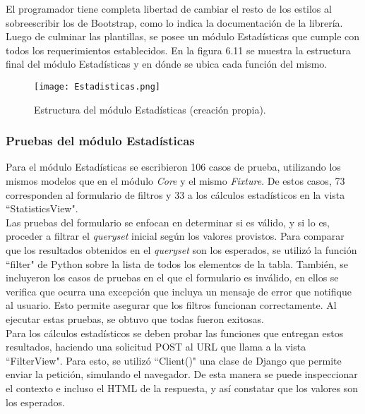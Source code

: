 El programador tiene completa libertad de cambiar el resto de los estilos al sobreescribir los de Bootstrap, como lo indica la documentación de la librería.\\

Luego de culminar las plantillas, se posee un módulo Estadísticas que cumple con todos los requerimientos establecidos. En la figura 6.11 se muestra la estructura final del módulo Estadísticas y en dónde se ubica cada función del mismo.

\begin{figure}[h]
    \centering
    \texttt{[image: Estadisticas.png]}
    \caption{ Estructura del módulo Estadísticas (creación propia).}
    \label{fig:figura6.12}
\end{figure}

\subsubsection{Pruebas del módulo Estadísticas}

Para el módulo Estadísticas se escribieron 106 casos de prueba, utilizando los mismos modelos que en el módulo \textit{Core} y el mismo \textit{Fixture}. De estos casos, 73 corresponden al formulario de filtros y 33 a los cálculos estadísticos en la vista “StatisticsView". \\

Las pruebas del formulario se enfocan en determinar si es válido, y si lo es, proceder a filtrar el \textit{queryset} inicial según los valores provistos. Para comparar que los resultados obtenidos en el \textit{queryset} son los esperados, se utilizó la función “filter" de Python sobre la lista de todos los elementos de la tabla. También, se incluyeron los casos de pruebas en el que el formulario es inválido, en ellos se verifica que ocurra una excepción que incluya un mensaje de error que notifique al usuario. Esto permite asegurar que los filtros funcionan correctamente. Al ejecutar estas pruebas, se obtuvo que todas fueron exitosas.\\

Para los cálculos estadísticos se deben probar las funciones que entregan estos resultados, haciendo una solicitud POST al URL que llama a la vista “FilterView". Para esto, se utilizó “Client()" una clase de Django que permite enviar la petición, simulando el navegador. De esta manera se puede inspeccionar el contexto e incluso el HTML de la respuesta, y así constatar que los valores son los esperados.

